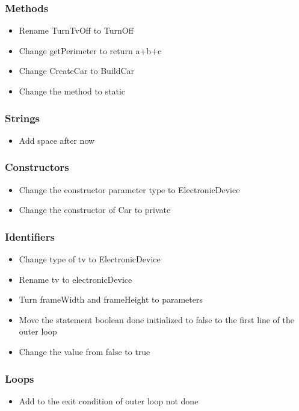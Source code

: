 \subsubsection{Methods}
\begin{itemize}
	\item Rename TurnTvOff to TurnOff
	\item Change getPerimeter to return a+b+c
	\item Change CreateCar to BuildCar
	\item Change the method to static
\end{itemize}
\subsubsection{Strings}
\begin{itemize}
	\item Add space after now
\end{itemize}
\subsubsection{Constructors}
\begin{itemize}
	\item Change the constructor parameter type to ElectronicDevice
	\item Change the constructor of Car to private
\end{itemize}
\subsubsection{Identifiers}
\begin{itemize}
	\item Change type of tv to ElectronicDevice
	\item Rename tv to electronicDevice
	\item Turn frameWidth and frameHeight to parameters
	\item Move the statement boolean done initialized to false to the first line of the outer loop
	\item Change the value from false to true
\end{itemize}
\subsubsection{Loops}
\begin{itemize}
	\item Add to the exit condition of outer loop not done
\end{itemize}
